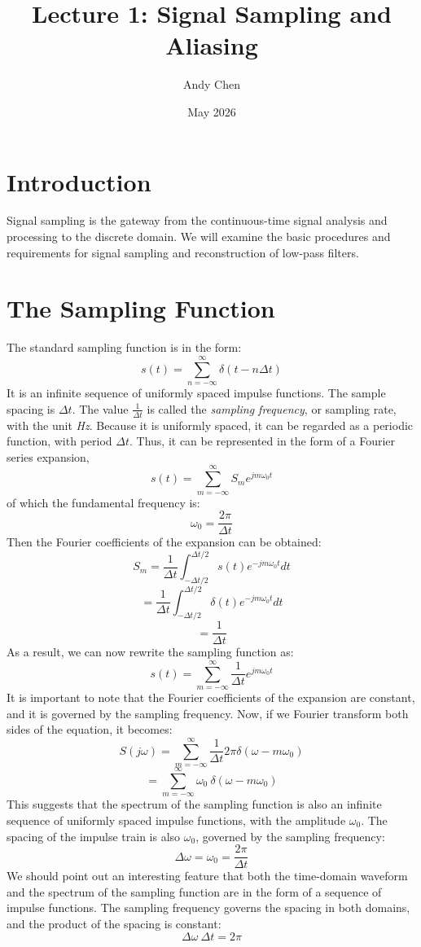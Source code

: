 \documentclass{article}
\title{Lecture 1: Signal Sampling and Aliasing}
\author{Andy Chen}
\date{May 2026}
\begin{document}
\maketitle

\section{Introduction}
Signal sampling is the gateway from the continuous-time signal analysis and processing to the discrete domain. We will examine the basic procedures and requirements for signal sampling and reconstruction of low-pass filters.

\section{The Sampling Function}
The standard sampling function is in the form:
\[
s(t) = \sum_{n=-\infty}^{\infty} \delta(t-n\Delta t)
\]
It is an infinite sequence of uniformly spaced impulse functions. The sample spacing is \(\Delta t\). The value \(\frac{1}{\Delta t}\) is called the \textit{sampling frequency}, or sampling rate, with the unit \textit{Hz}. Because it is uniformly spaced, it can be regarded as a periodic function, with period \(\Delta t\). Thus, it can be represented in the form of a Fourier series expansion,
\[
s(t) = \sum_{m=-\infty}^{\infty} S_m e^{jm\omega_0t}
\]
of which the fundamental frequency is:
\[
\omega_0 = \frac{2\pi}{\Delta t}
\]
Then the Fourier coefficients of the expansion can be obtained:
\[
S_m = \frac{1}{\Delta t} \int_{-\Delta t/2}^{\Delta t/2} s(t) e^{-jm\omega_0t}dt
\]
\[
= \frac{1}{\Delta t} \int_{-\Delta t/2}^{\Delta t/2} \delta(t) e^{-jm\omega_0t}dt
\]
\[
= \frac{1}{\Delta t}
\]
As a result, we can now rewrite the sampling function as:
\[
s(t) = \sum_{m=-\infty}^{\infty} \frac{1}{\Delta t} e^{jm\omega_0t}
\]
It is important to note that the Fourier coefficients of the expansion are constant, and it is governed by the sampling frequency. Now, if we Fourier transform both sides of the equation, it becomes:
\[
S(j\omega) = \sum_{m=-\infty}^{\infty} \frac{1}{\Delta t} 2\pi \delta(\omega-m\omega_0)
\]
\[
= \sum_{m=-\infty}^{\infty} \omega_0 \ \delta(\omega-m\omega_0)
\]
This suggests that the spectrum of the sampling function is also an infinite sequence of uniformly spaced impulse functions, with the amplitude \(\omega_0\). The spacing of the impulse train is also \(\omega_0\), governed by the sampling frequency:
\[
\Delta\omega = \omega_0 = \frac{2\pi}{\Delta t}
\]
We should point out an interesting feature that both the time-domain waveform and the spectrum of the sampling function are in the form of a sequence of impulse functions. The sampling frequency governs the spacing in both domains, and the product of the spacing is constant:
\[
\Delta\omega\ \Delta t = 2\pi
\]
\end{document}
